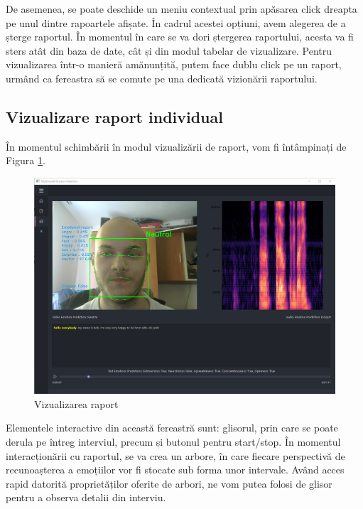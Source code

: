 \documentclass[a4paper, 12pt]{report}
\begin{document}
	De asemenea, se poate deschide un meniu contextual prin apăsarea click dreapta pe unul dintre rapoartele afișate. În cadrul acestei opțiuni, avem alegerea de a șterge raportul. În momentul în care se va dori ștergerea raportului, acesta va fi sters atât din baza de date, cât și din modul tabelar de vizualizare. Pentru vizualizarea într-o manieră amănunțită, putem face dublu click pe un raport, urmând ca fereastra să se comute pe una dedicată vizionării raportului.
	
	\clearpage
	\subsection{Vizualizare raport individual}
	În momentul schimbării în modul vizualizării de raport, vom fi întâmpinați de Figura \ref{fig:emotion_report}.
	
	\begin{figure}[H]
		\begin{center}
			\includegraphics[scale=0.35]{images/emotion_report_visualize.png}
		\end{center}
		\caption{Vizualizarea raport}
		\label{fig:emotion_report}
	\end{figure}
	
	Elementele interactive din această fereastră sunt: glisorul, prin care se poate derula pe întreg interviul, precum și butonul pentru start/stop. În momentul interacționării cu raportul, se va crea un arbore, în care fiecare perspectivă de recunoașterea a emoțiilor vor fi stocate sub forma unor intervale. Având acces rapid datorită proprietăților oferite de arbori, ne vom putea folosi de glisor pentru a observa detalii din interviu.
	
\end{document}
